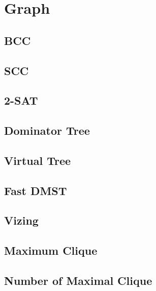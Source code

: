 \documentclass[a4paper,10pt,oneside]{article}
\begin{document}
\section{Graph}

\subsection{BCC}


\subsection{SCC}


\subsection{2-SAT}


\subsection{Dominator Tree}


\subsection{Virtual Tree}


%

\subsection{Fast DMST}


\subsection{Vizing}


\subsection{Maximum Clique}


\subsection{Number of Maximal Clique}

\end{document}
